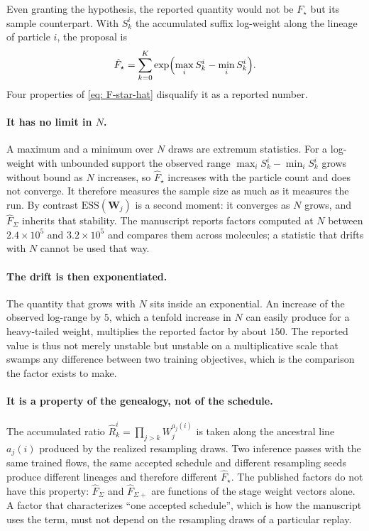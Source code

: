 \documentclass[11pt]{article}
\theoremstyle{plain}
\newcommand{\ESS}{\mathrm{ESS}}
\begin{document}
Even granting the hypothesis, the reported quantity would not be $F_\star$ but
its sample counterpart. With $S_k^i$ the accumulated suffix log-weight along
the lineage of particle $i$, the proposal is
\begin{equation}
    \hat F_\star=\sum_{k=0}^{K}\exp\Bigl(\max_i S_k^i-\min_i S_k^i\Bigr).
    \label{eq: F-star-hat}
\end{equation}
Four properties of \eqref{eq: F-star-hat} disqualify it as a reported number.

\paragraph{It has no limit in $N$.} A maximum and a minimum over $N$ draws are
extremum statistics. For a log-weight with unbounded support the observed range
$\max_iS_k^i-\min_iS_k^i$ grows without bound as $N$ increases, so
$\hat F_\star$ increases with the particle count and does not converge. It
therefore measures the sample size as much as it measures the run. By contrast
$\ESS(\mathbf W_j)$ is a second moment: it converges as $N$ grows, and
$\hat F_\Sigma$ inherits that stability. The manuscript reports factors
computed at $N$ between $2.4\times10^5$ and $3.2\times10^5$ and compares them
across molecules; a statistic that drifts with $N$ cannot be used that way.

\paragraph{The drift is then exponentiated.} The quantity that grows with $N$
sits inside an exponential. An increase of the observed log-range by $5$, which
a tenfold increase in $N$ can easily produce for a heavy-tailed weight,
multiplies the reported factor by about $150$. The reported value is thus not
merely unstable but unstable on a multiplicative scale that swamps any
difference between two training objectives, which is the comparison the
factor exists to make.

\paragraph{It is a property of the genealogy, not of the schedule.} The
accumulated ratio $\hat R_k^i=\prod_{j>k}W_j^{a_j(i)}$ is taken along the
ancestral line $a_j(i)$ produced by the realized resampling draws. Two
inference passes with the same trained flows, the same accepted schedule and
different resampling seeds produce different lineages and therefore different
$\hat F_\star$. The published factors do not have this property:
$\hat F_\Sigma$ and $\hat F_{\Sigma+}$ are functions of the stage weight
vectors alone. A factor that characterizes ``one accepted schedule'', which is
how the manuscript uses the term, must not depend on the resampling draws of a
particular replay.
\end{document}
